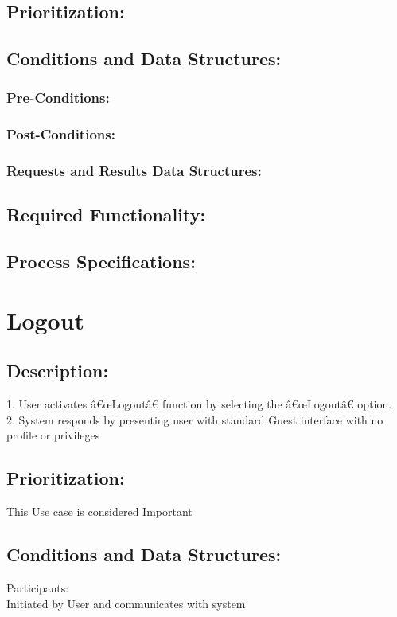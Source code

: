 \documentclass[a4paper,11pt]{article}
\begin{document}
\subsection{Prioritization:} 
\subsection{Conditions and Data Structures:}
\subsubsection*{Pre-Conditions:}
\subsubsection*{Post-Conditions:}
\subsubsection*{Requests and Results Data Structures:}
\subsection{Required Functionality:} 
\subsection{Process Specifications:} 

\section{Logout}
\subsection*{Description:}
1.	User activates â€œLogoutâ€ function by selecting the â€œLogoutâ€ option.\\
2.	System responds by presenting user with standard Guest interface with no profile or privileges\\
\subsection{Prioritization:}
This Use case is considered Important\\ 
\subsection{Conditions and Data Structures:}
Participants:\\
Initiated by User and communicates with system\\
\end{document}
